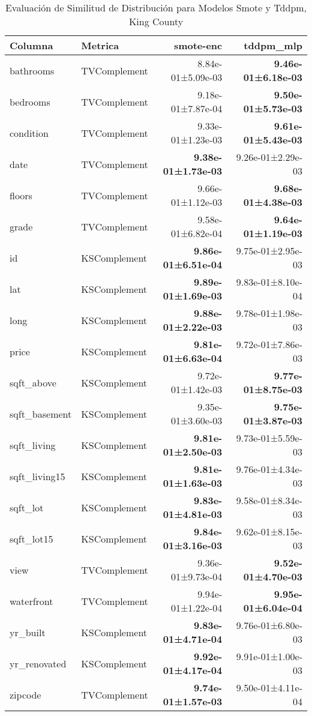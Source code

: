 \begin{table}[H]
\centering
\fontsize{10}{14}\selectfont
\caption{Evaluaci\'on de Similitud de Distribuci\'on para Modelos Smote y Tddpm, King County}
\label{table-shape-king county-a}
\begin{tabular}{|l|l|r|r|}
\hline
\rowcolor[gray]{0.8}
Columna & Metrica & smote-enc & tddpm\_mlp \\
\hline bathrooms & TVComplement & \cellcolor[rgb]{0.9, 0.54, 0.52} 8.84e-01±5.09e-03 & \bfseries 9.46e-01±6.18e-03 \\
\hline bedrooms & TVComplement & 9.18e-01±7.87e-04 & \bfseries 9.50e-01±5.73e-03 \\
\hline condition & TVComplement & 9.33e-01±1.23e-03 & \bfseries 9.61e-01±5.43e-03 \\
\hline date & TVComplement & \bfseries 9.38e-01±1.73e-03 & \cellcolor[rgb]{0.9, 0.54, 0.52} 9.26e-01±2.29e-03 \\
\hline floors & TVComplement & 9.66e-01±1.12e-03 & \bfseries 9.68e-01±4.38e-03 \\
\hline grade & TVComplement & 9.58e-01±6.82e-04 & \bfseries 9.64e-01±1.19e-03 \\
\hline id & KSComplement & \bfseries 9.86e-01±6.51e-04 & 9.75e-01±2.95e-03 \\
\hline lat & KSComplement & \bfseries 9.89e-01±1.69e-03 & 9.83e-01±8.10e-04 \\
\hline long & KSComplement & \bfseries 9.88e-01±2.22e-03 & 9.78e-01±1.98e-03 \\
\hline price & KSComplement & \bfseries 9.81e-01±6.63e-04 & 9.72e-01±7.86e-03 \\
\hline sqft\_above & KSComplement & 9.72e-01±1.42e-03 & \bfseries 9.77e-01±8.75e-03 \\
\hline sqft\_basement & KSComplement & 9.35e-01±3.60e-03 & \bfseries 9.75e-01±3.87e-03 \\
\hline sqft\_living & KSComplement & \bfseries 9.81e-01±2.50e-03 & 9.73e-01±5.59e-03 \\
\hline sqft\_living15 & KSComplement & \bfseries 9.81e-01±1.63e-03 & 9.76e-01±4.34e-03 \\
\hline sqft\_lot & KSComplement & \bfseries 9.83e-01±4.81e-03 & 9.58e-01±8.34e-03 \\
\hline sqft\_lot15 & KSComplement & \bfseries 9.84e-01±3.16e-03 & 9.62e-01±8.15e-03 \\
\hline view & TVComplement & 9.36e-01±9.73e-04 & \bfseries 9.52e-01±4.70e-03 \\
\hline waterfront & TVComplement & 9.94e-01±1.22e-04 & \bfseries 9.95e-01±6.04e-04 \\
\hline yr\_built & KSComplement & \bfseries 9.83e-01±4.71e-04 & 9.76e-01±6.80e-03 \\
\hline yr\_renovated & KSComplement & \bfseries 9.92e-01±4.17e-04 & 9.91e-01±1.00e-03 \\
\hline zipcode & TVComplement & \bfseries 9.74e-01±1.57e-03 & 9.50e-01±4.11e-04 \\
\hline
\end{tabular}
\end{table}
